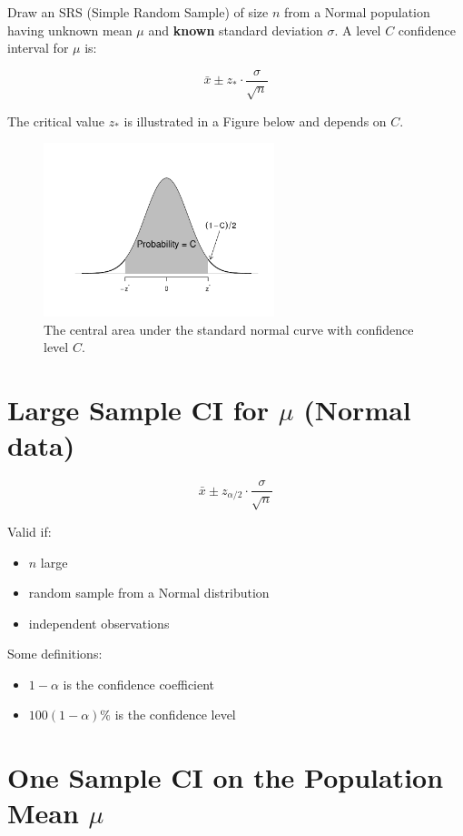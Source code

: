 Draw an SRS (Simple Random Sample) of size $n$ from a Normal population having unknown mean $\mu$ and \textbf{known} standard deviation $\sigma$. A level $C$ confidence interval for $\mu$ is:

\[
\bar{x} \pm z_{\ast} \cdot \frac{\sigma}{\sqrt{n}}
\]

The critical value $z_{\ast}$ is illustrated in a Figure below and depends on $C$.

\begin{figure}[h!]
  \centering
  \includegraphics[width=0.6\textwidth]{Section6/normal_confidence_curve.pdf}
  \caption{The central area under the standard normal curve with confidence level \( C \).}
\end{figure}

\section*{Large Sample CI for $\mu$ (Normal data)}

\[
\bar{x} \pm z_{\alpha/2} \cdot \frac{\sigma}{\sqrt{n}}
\]

Valid if:
\begin{itemize}
  \item $n$ large
  \item random sample from a Normal distribution
  \item independent observations
\end{itemize}

Some definitions:
\begin{itemize}
  \item $1 - \alpha$ is the confidence coefficient
  \item $100(1 - \alpha)\%$ is the confidence level
\end{itemize}


\section*{One Sample CI on the Population Mean $\mu$}


